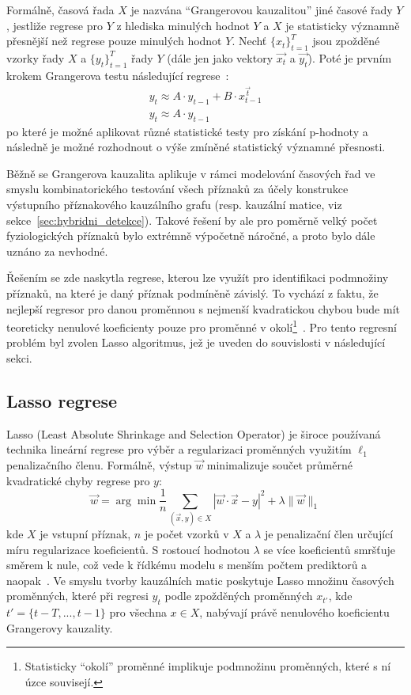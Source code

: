 Formálně, časová řada $X$ je nazvána \enquote{Grangerovou kauzalitou} jiné
časové řady $Y$, jestliže regrese pro $Y$ z hlediska minulých hodnot $Y$ a $X$
je statisticky významně přesnější než regrese pouze minulých hodnot $Y$. Nechť
$\{x_t\}_{t=1}^T$ jsou zpožděné vzorky řady $X$ a $\{y_t\}_{t=1}^T$
řady $Y$ (dále jen jako vektory $\overrightarrow{x_t}$ a $\overrightarrow{y_t}$).
Poté je prvním krokem Grangerova testu následující regrese~\cite{Arnold2007}:
\begin{equation}
    \begin{gathered}
        y_t \approx A \cdot y_{t-1}+B \cdot x_{t-1}^{\vec{t}} \\
        y_t \approx A \cdot y_{t-1}
    \end{gathered}
\end{equation}
po které je možné aplikovat různé statistické testy pro získání p-hodnoty a
následně je možné rozhodnout o výše zmíněné statistický významné přesnosti.

Běžně se Grangerova kauzalita aplikuje v rámci modelování časových řad ve smyslu
kombinatorického testování všech příznaků za účely konstrukce výstupního
příznakového kauzálního grafu (resp. kauzální matice, viz
sekce~\ref{sec:hybridni_detekce}). Takové řešení by ale pro poměrně velký počet
fyziologických příznaků bylo extrémně výpočetně náročné, a proto bylo dále
uznáno za nevhodné.

Řešením se zde naskytla regrese, kterou lze využít pro identifikaci podmnožiny
příznaků, na které je daný příznak podmíněně závislý. To vychází z faktu, že
nejlepší regresor pro danou proměnnou s nejmenší kvadratickou chybou bude mít
teoreticky nenulové koeficienty pouze pro proměnné v okolí\footnote{Statisticky
    \enquote{okolí} proměnné implikuje podmnožinu proměnných, které s ní úzce
    souvisejí.}~\cite{Schindler2013,Arnold2007}. Pro tento regresní problém byl
zvolen Lasso algoritmus, jež je uveden do souvislosti v následující sekci.

\subsection{Lasso regrese}
\label{subsec:lasso}
\gls{Lasso} (Least Absolute Shrinkage and Selection Operator) je široce
používaná technika lineární regrese pro výběr a regularizaci proměnných využitím
$\ell_1$ penalizačního členu. Formálně, výstup $\vec{w}$ minimalizuje součet
průměrné kvadratické chyby regrese pro $y$:
\begin{equation}
    \vec{w}=\arg \min \frac{1}{n} \sum_{(\vec{x}, y) \in X}|\vec{w} \cdot \vec{x}-y|^2+\lambda\|\vec{w}\|_1
\end{equation}
kde $X$ je vstupní příznak, $n$ je počet vzorků v $X$ a $\lambda$ je penalizační
člen určující míru regularizace koeficientů. S rostoucí hodnotou $\lambda$ se
více koeficientů smršťuje směrem k nule, což vede k řídkému modelu s menším
počtem prediktorů a naopak~\cite{Tibshirani1996}. Ve smyslu tvorby kauzálních
matic poskytuje Lasso množinu časových proměnných, které při regresi $y_t$ podle
zpožděných proměnných $x_{t'}$, kde $t'=\{t-T,...,t -1\}$ pro všechna $x \in X$,
nabývají právě nenulového koeficientu Grangerovy kauzality.

